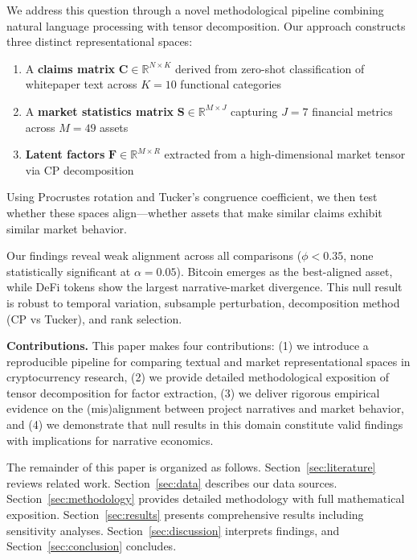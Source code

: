 \documentclass[11pt,twocolumn]{article}
\begin{document}
We address this question through a novel methodological pipeline combining natural language processing with tensor decomposition. Our approach constructs three distinct representational spaces:

\begin{enumerate}
    \item A \textbf{claims matrix} $\mathbf{C} \in \mathbb{R}^{N \times K}$ derived from zero-shot classification of whitepaper text across $K = 10$ functional categories
    \item A \textbf{market statistics matrix} $\mathbf{S} \in \mathbb{R}^{M \times J}$ capturing $J = 7$ financial metrics across $M = 49$ assets
    \item \textbf{Latent factors} $\mathbf{F} \in \mathbb{R}^{M \times R}$ extracted from a high-dimensional market tensor via CP decomposition
\end{enumerate}

Using Procrustes rotation and Tucker's congruence coefficient, we then test whether these spaces align---whether assets that make similar claims exhibit similar market behavior.

Our findings reveal weak alignment across all comparisons ($\phi < 0.35$, none statistically significant at $\alpha = 0.05$). Bitcoin emerges as the best-aligned asset, while DeFi tokens show the largest narrative-market divergence. This null result is robust to temporal variation, subsample perturbation, decomposition method (CP vs Tucker), and rank selection.

\textbf{Contributions.} This paper makes four contributions: (1) we introduce a reproducible pipeline for comparing textual and market representational spaces in cryptocurrency research, (2) we provide detailed methodological exposition of tensor decomposition for factor extraction, (3) we deliver rigorous empirical evidence on the (mis)alignment between project narratives and market behavior, and (4) we demonstrate that null results in this domain constitute valid findings with implications for narrative economics.

The remainder of this paper is organized as follows. Section~\ref{sec:literature} reviews related work. Section~\ref{sec:data} describes our data sources. Section~\ref{sec:methodology} provides detailed methodology with full mathematical exposition. Section~\ref{sec:results} presents comprehensive results including sensitivity analyses. Section~\ref{sec:discussion} interprets findings, and Section~\ref{sec:conclusion} concludes.
\end{document}
